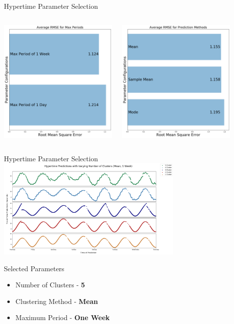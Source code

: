 \documentclass{beamer}
\begin{document}
\begin{frame}[t]{Hypertime Parameter Selection}

  \begin{columns}[t]
    {\includegraphics[width=2.3in]{images/Average_RMSE_for_Max_Periods.png}}

    {\includegraphics[width=2.3in]{images/Average_RMSE_for_Prediction_Methods.png}}
  \end{columns}

\end{frame}



\begin{frame}[t]{Hypertime Parameter Selection}
    {\includegraphics[width = 3.6in]{images/varying_clusters.png}}
    \vspace*{-0.45cm}

  \begin{block}{Selected Parameters}
    \begin{itemize}
      \item Number of Clusters - \textbf{5}
      \item Clustering Method - \textbf{Mean}
      \item Maximum Period - \textbf{One Week}
    \end{itemize}
  \end{block}

\end{frame}
\end{document}
